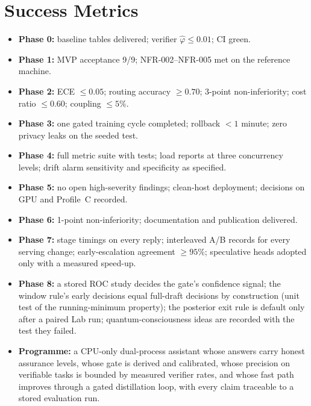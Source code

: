 \documentclass[11pt,a4paper]{article}
\begin{document}
\section{Success Metrics}
\begin{itemize}
\item \textbf{Phase 0:} baseline tables delivered; verifier $\hat\varphi\le0.01$; CI green.
\item \textbf{Phase 1:} MVP acceptance 9/9; NFR-002--NFR-005 met on the reference machine.
\item \textbf{Phase 2:} ECE $\le0.05$; routing accuracy $\ge0.70$; 3-point non-inferiority; cost ratio $\le0.60$; coupling $\le5\%$.
\item \textbf{Phase 3:} one gated training cycle completed; rollback $<1$ minute; zero privacy leaks on the seeded test.
\item \textbf{Phase 4:} full metric suite with tests; load reports at three concurrency levels; drift alarm sensitivity and specificity as specified.
\item \textbf{Phase 5:} no open high-severity findings; clean-host deployment; decisions on GPU and Profile~C recorded.
\item \textbf{Phase 6:} 1-point non-inferiority; documentation and publication delivered.
\item \textbf{Phase 7:} stage timings on every reply; interleaved A/B records for every serving change; early-escalation agreement $\ge95\%$; speculative heads adopted only with a measured speed-up.
\item \textbf{Phase 8:} a stored ROC study decides the gate's confidence signal; the window rule's early decisions equal full-draft decisions by construction (unit test of the running-minimum property); the posterior exit rule is default only after a paired Lab run; quantum-consciousness ideas are recorded with the test they failed.
\item \textbf{Programme:} a CPU-only dual-process assistant whose answers carry honest assurance levels, whose gate is derived and calibrated, whose precision on verifiable tasks is bounded by measured verifier rates, and whose fast path improves through a gated distillation loop, with every claim traceable to a stored evaluation run.
\end{itemize}
\end{document}
